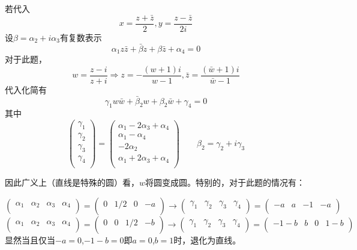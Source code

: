 \documentclass[a4paper]{ctexart}
\begin{document}
若代入
$$
x=\frac{z+\bar{z}}{2},y=\frac{z-\bar{z}}{2i}
$$
设$\beta =\alpha _2+i\alpha _3$有复数表示
$$
\alpha _1z\bar{z}+\bar{\beta}z+\beta \bar{z}+\alpha _4=0
$$
对于此题，
$$
w=\frac{z-i}{z+i}\Rightarrow z=-\frac{\left( w+1 \right) i}{w-1},\bar{z}=\frac{\left( \bar{w}+1 \right) i}{\bar{w}-1}
$$
代入化简有
$$
\gamma _1w\bar{w}+\bar{\beta}_2w+\beta _2\bar{w}+\gamma _4=0
$$
其中
$$
\left( \begin{array}{c}
	\gamma _1\\
	\gamma _2\\
	\gamma _3\\
	\gamma _4\\
\end{array} \right) =\left( \begin{array}{c}
	\alpha _1-2\alpha _3+\alpha _4\\
	\alpha _1-\alpha _4\\
	-2\alpha _2\\
	\alpha _1+2\alpha _3+\alpha _4\\
\end{array} \right) \qquad \beta _2=\gamma _2+i\gamma _3
$$

因此广义上（直线是特殊的圆）看，$w$将圆变成圆。特别的，对于此题的情况有：

$$
\left( \begin{matrix}
	\alpha _1&		\alpha _2&		\alpha _3&		\alpha _4\\
\end{matrix} \right) =\left( \begin{matrix}
	0&		1/2&		0&		-a\\
\end{matrix} \right) \rightarrow \left( \begin{matrix}
	\gamma _1&		\gamma _2&		\gamma _3&		\gamma _4\\
\end{matrix} \right) =\left( \begin{matrix}
	-a&		a&		-1&		-a\\
\end{matrix} \right) 
$$
$$
\left( \begin{matrix}
	\alpha _1&		\alpha _2&		\alpha _3&		\alpha _4\\
\end{matrix} \right) =\left( \begin{matrix}
	0&		0&		1/2&		-b\\
\end{matrix} \right) \rightarrow \left( \begin{matrix}
	\gamma _1&		\gamma _2&		\gamma _3&		\gamma _4\\
\end{matrix} \right) =\left( \begin{matrix}
	-1-b&		b&		0&		1-b\\
\end{matrix} \right) 
$$
显然当且仅当$-a=0$,$-1-b=0$即$a=0$,$b=1$时，退化为直线。
\end{document}
